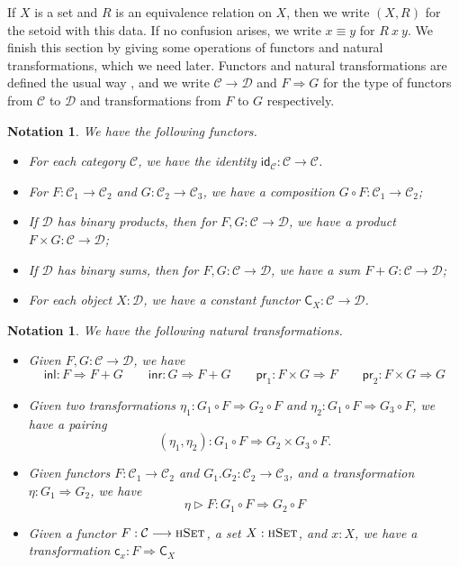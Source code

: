 \documentclass[9pt]{entcs}
\newtheorem{notation}[thm]{Notation}
\newcommand{\type}[1]{\textsc{#1}}
\newcommand{\functortxt}[1]{\mathsf{#1}}
\newcommand{\nattranstxt}[1]{\mathsf{#1}}
\newcommand{\hset}{\type{hSet}} %
\newcommand{\0}{\textbf{0}} %
\newcommand{\functor}[2]{#1 \longrightarrow #2} %
\newcommand{\idf}[1]{\functortxt{id}_{#1}} %
\newcommand{\Cf}[1]{\functortxt{C}_{#1}} %
\newcommand{\compf}[2]{#2 \circ #1} %
\newcommand{\prodf}[2]{#1 \times #2} %
\newcommand{\sumf}[2]{#1 + #2} %
\newcommand{\nattrans}[2]{#1 \Longrightarrow #2} %
\newcommand{\ctrans}[1]{\nattranstxt{c}_{#1}} %
\newcommand{\lwhisker}[2]{#2 \vartriangleright #1} %
\newcommand{\inlt}{\nattranstxt{inl}} %
\newcommand{\inrt}{\nattranstxt{inr}} %
\newcommand{\prlt}{\nattranstxt{pr}_1} %
\newcommand{\prrt}{\nattranstxt{pr}_2} %
\newcommand{\pairt}[2]{(#1 , #2)} %
\begin{document}
If $X$ is a set and $R$ is an equivalence relation on $X$, then we write $(X, R)$ for the setoid with this data.
If no confusion arises, we write $x \equiv y$ for $R \> x \> y$.
We finish this section by giving some operations of functors and natural transformations, which we need later.
Functors and natural transformations are defined the usual way \cite{mac2013categories}, and we write $\functor{\mathcal{C}}{\mathcal{D}}$ and $\nattrans{F}{G}$ for the type of functors from $\mathcal{C}$ to $\mathcal{D}$ and transformations from $F$ to $G$ respectively.

\begin{notation}
\label{def:functor}
We have the following functors.
\begin{itemize}
	\item For each category $\mathcal{C}$, we have the identity $\idf{\mathcal{C}} : \functor{\mathcal{C}}{\mathcal{C}}$.
	\item For $F : \functor{\mathcal{C}_1}{\mathcal{C}_2}$ and $G : \functor{\mathcal{C}_2}{\mathcal{C}_3}$, we have a composition $\compf{F}{G} : \functor{\mathcal{C}_1}{\mathcal{C}_2}$;
	\item If $\mathcal{D}$ has binary products, then for $F, G : \functor{\mathcal{C}}{\mathcal{D}}$, we have a product $\prodf{F}{G} : \functor{\mathcal{C}}{\mathcal{D}}$;
	\item If $\mathcal{D}$ has binary sums, then for $F, G : \functor{\mathcal{C}}{\mathcal{D}}$, we have a sum $\sumf{F}{G} : \functor{\mathcal{C}}{\mathcal{D}}$;
	\item For each object $X : \mathcal{D}$, we have a constant functor $\Cf{X} : \functor{\mathcal{C}}{\mathcal{D}}$.
\end{itemize}
\end{notation}

\begin{notation}
\label{def:nattrans}
We have the following natural transformations.
\begin{itemize}
	\item Given $F, G : \functor{\mathcal{C}}{\mathcal{D}}$, we have
	\[
	\inlt : \nattrans{F}{\sumf{F}{G}}
	\quad \quad
	\inrt : \nattrans{G}{\sumf{F}{G}}
	\quad \quad
	\prlt : \nattrans{\prodf{F}{G}}{F}
	\quad \quad
	\prrt : \nattrans{\prodf{F}{G}}{G}
	\]
	\item Given two transformations $\eta_1 : \nattrans{\compf{F}{G_1}}{\compf{F}{G_2}}$ and $\eta_2 : \nattrans{\compf{F}{G_1}}{\compf{F}{G_3}}$, we have a pairing 
	\[
	\pairt{\eta_1}{\eta_2} : \nattrans{\compf{F}{G_1}}{\compf{F}{\prodf{G_2}{G_3}}}.
	\]
	\item Given functors $F : \functor{\mathcal{C}_1}{\mathcal{C}_2}$ and $G_1. G_2 : \functor{\mathcal{C}_2}{\mathcal{C}_3}$, and a transformation $\eta : \nattrans{G_1}{G_2}$, we have
	\[
	\lwhisker{F}{\eta} : \nattrans{\compf{F}{G_1}}{\compf{F}{G_2}}
	\]
	\item Given a functor $F : \functor{\mathcal{C}}{\hset}$, a set $X : \hset$, and $x : X$, we have a transformation $\ctrans{x} : \nattrans{F}{\Cf{X}}$
\end{itemize}
\end{notation}
\end{document}
